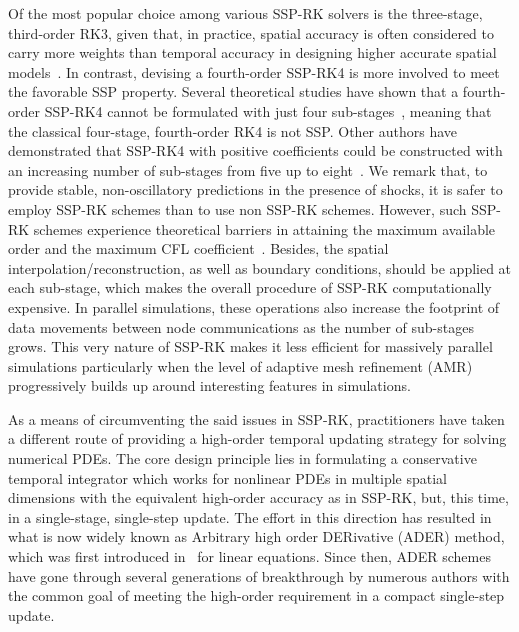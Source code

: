 \documentclass[times,preprint,3p]{elsarticle}
\begin{document}
Of the most popular choice among various SSP-RK solvers
is the three-stage, third-order RK3, given that, in practice,
spatial accuracy is often considered to %
carry more weights
than temporal accuracy in designing %
higher accurate spatial models~\cite{balsara2000monotonicity,mignone2010high}.
In contrast, devising a fourth-order SSP-RK4 is more involved to meet the favorable
SSP property. Several theoretical studies have shown that
a fourth-order SSP-RK4 cannot be formulated with just
four sub-stages~\cite{gottlieb1998total}, meaning that
the classical four-stage, fourth-order RK4 is not SSP\@.
Other authors have demonstrated that SSP-RK4 with positive coefficients
could be constructed with an increasing number of sub-stages from five
up to eight~\cite{spiteri2002new,spiteri2003non}.
We remark that, to provide stable, non-oscillatory predictions
in the presence of shocks, it is safer to employ SSP-RK schemes than
to use non SSP-RK schemes.
However, such SSP-RK schemes experience theoretical barriers in attaining
the maximum available order and the maximum
CFL coefficient~\cite{ruuth2002two,giuliani2019optimal}.
%
Besides, the spatial interpolation/reconstruction, as well as boundary conditions,
should be applied at each sub-stage, which makes the overall procedure of SSP-RK
computationally expensive. In parallel simulations,
these operations also increase the footprint
of data movements between node communications
as the number of sub-stages grows.
This very nature of SSP-RK makes it less efficient for
massively parallel simulations particularly when
the level of adaptive mesh refinement (AMR) progressively builds up
around interesting features in simulations.



As a means of circumventing the said issues in SSP-RK, practitioners have
taken a different route of providing a high-order temporal updating strategy for solving
numerical PDEs. The core design principle lies in formulating
a conservative temporal integrator
which works for nonlinear PDEs in multiple spatial dimensions
with the equivalent high-order accuracy as in SSP-RK,
but, this time, in a single-stage, single-step update.
The effort in this direction has resulted in what is now widely known as
Arbitrary high order DERivative (ADER) method,
which was first introduced in~\cite{toro2001towards} for linear equations.
Since then, ADER schemes have gone through several generations of breakthrough
by numerous authors with the common goal of meeting
the high-order requirement in a compact single-step update.
\end{document}
